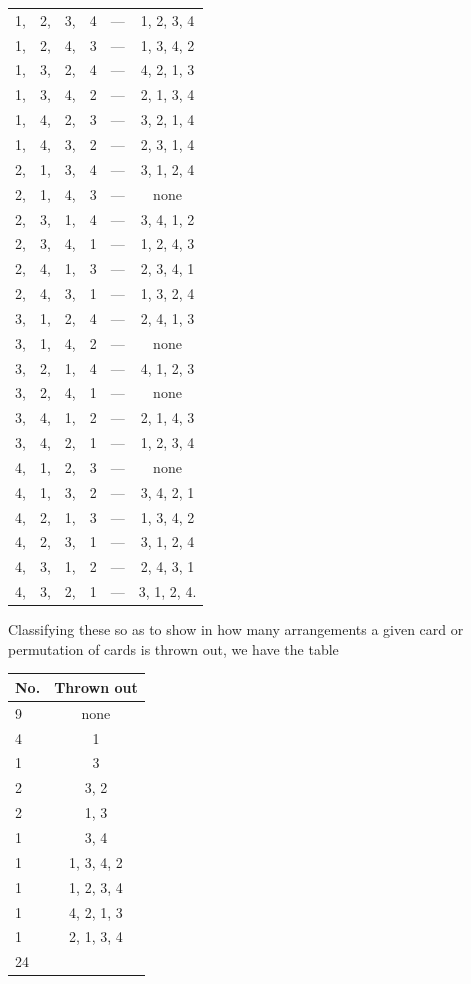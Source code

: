 \documentclass[12pt,a4paper]{article}
\theoremstyle{cayley}
\theoremstyle{definition}
\numberwithin{equation}{section}
\begin{document}
\begin{center}
\begin{tabular}{cccccc}
1, & 2, & 3, & 4 &---& 1, 2, 3, 4 \\
1, & 2, & 4, & 3 &---& 1, 3, 4, 2 \\
1, & 3, & 2, & 4 &---& 4, 2, 1, 3 \\
1, & 3, & 4, & 2 &---& 2, 1, 3, 4 \\
1, & 4, & 2, & 3 &---& 3, 2, 1, 4 \\
1, & 4, & 3, & 2 &---& 2, 3, 1, 4 \\
2, & 1, & 3, & 4 &---& 3, 1, 2, 4 \\
2, & 1, & 4, & 3 &---& none \\
2, & 3, & 1, & 4 &---& 3, 4, 1, 2 \\
2, & 3, & 4, & 1 &---& 1, 2, 4, 3 \\
2, & 4, & 1, & 3 &---& 2, 3, 4, 1 \\
2, & 4, & 3, & 1 &---& 1, 3, 2, 4 \\
3, & 1, & 2, & 4 &---& 2, 4, 1, 3 \\
3, & 1, & 4, & 2 &---& none \\
3, & 2, & 1, & 4 &---& 4, 1, 2, 3 \\
3, & 2, & 4, & 1 &---& none \\
3, & 4, & 1, & 2 &---& 2, 1, 4, 3 \\
3, & 4, & 2, & 1 &---& 1, 2, 3, 4 \\
4, & 1, & 2, & 3 &---& none \\
4, & 1, & 3, & 2 &---& 3, 4, 2, 1 \\
4, & 2, & 1, & 3 &---& 1, 3, 4, 2 \\
4, & 2, & 3, & 1 &---& 3, 1, 2, 4 \\
4, & 3, & 1, & 2 &---& 2, 4, 3, 1 \\
4, & 3, & 2, & 1 &---& 3, 1, 2, 4.
\end{tabular}
\end{center}

Classifying these so as to show in how many arrangements a given card or permutation of cards is thrown out, we have the table

\begin{center}
\begin{tabular}{lc}
No. & Thrown out \\
\midrule
9 & none \\
4 & 1 \\
1 & 3 \\
2 & 3, 2 \\
2 & 1, 3 \\
1 & 3, 4 \\
1 & 1, 3, 4, 2 \\
1 & 1, 2, 3, 4 \\
1 & 4, 2, 1, 3 \\
1 & 2, 1, 3, 4 \\
\midrule
24 &
\end{tabular}
\end{center}
\end{document}
